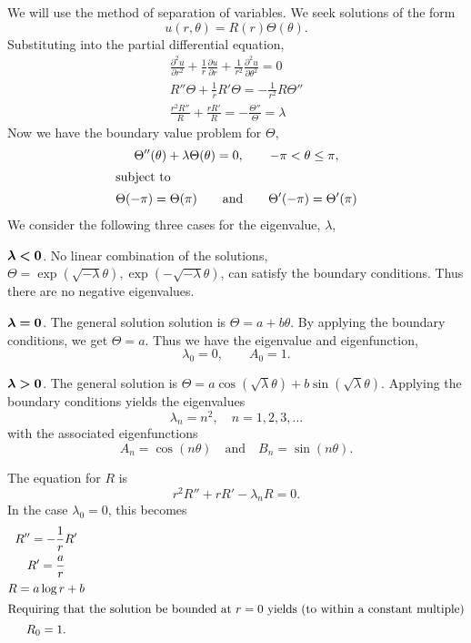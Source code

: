 We will use the method of separation of variables.  We seek solutions of the
form
\[ u(r,\theta) = R(r) \Theta(\theta). \]
Substituting into the partial differential equation,
\begin{gather*}
  \frac{\partial^2 u}{\partial r^2} + \frac{1}{r} \frac{\partial u}{\partial r}
  + \frac{1}{r^2} \frac{\partial^2 u}{\partial \theta^2} = 0 \\
  R'' \Theta + \frac{1}{r} R' \Theta = - \frac{1}{r^2} R \Theta'' \\
  \frac{r^2 R''}{R} + \frac{r R'}{R} = - \frac{\Theta''}{\Theta} = \lambda
\end{gather*}
Now we have the boundary value problem for $\Theta$,
\begin{gather*}
  \Theta''(\theta) + \lambda \Theta(\theta) = 0,
  \qquad -\pi < \theta \leq \pi,  \\
  \intertext{subject to}
  \Theta(-\pi) = \Theta(\pi) \qquad \mathrm{and} \qquad
  \Theta'(-\pi) = \Theta'(\pi)
\end{gather*}
We consider the following three cases for the eigenvalue, $\lambda$,
\begin{description}
\item{$\bf \boldsymbol{\lambda} \boldsymbol{<} 0$.}
  No linear combination of the solutions,
  $\Theta = \exp(\sqrt{-\lambda} \theta), \exp(-\sqrt{-\lambda} \theta)$,
  can satisfy the boundary conditions.  Thus there are no negative eigenvalues.
\item{$\bf \boldsymbol{\lambda} \boldsymbol{=} 0$.}
  The general solution solution is $\Theta = a + b \theta$.  By applying
  the boundary conditions, we get $\Theta = a$.  Thus we have the eigenvalue and
  eigenfunction,
  \[\lambda_0 = 0, \qquad  A_0 = 1. \]
\item{$\bf \boldsymbol{\lambda} \boldsymbol{>} 0$.}
  The general solution is $\Theta = a \cos (\sqrt{\lambda} \theta) +
  b \sin (\sqrt{\lambda} \theta)$.  Applying the boundary conditions yields the
  eigenvalues
  \[ \lambda_n = n^2, \quad n = 1, 2, 3, \ldots \]
  with the associated eigenfunctions
  \[ A_n = \cos (n \theta) \quad \mathrm{and} \quad B_n = \sin(n \theta).\]
\end{description}

The equation for $R$ is
\[ r^2 R'' + r R' - \lambda_n R = 0.\]
In the case $\lambda_0 = 0$, this becomes
\begin{gather*}
  R'' = - \frac{1}{r} R'  \\
  R' = \frac{a}{r} \\
  R = a \log r + b \\
  \intertext{Requiring that the solution be bounded at $r=0$ yields (to within
    a constant multiple)}
  R_0 = 1.
\end{gather*}

